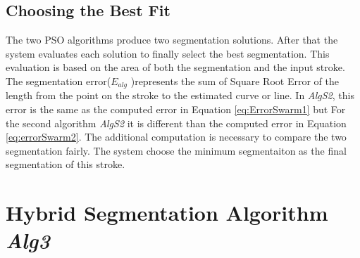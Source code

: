 \subsection{Choosing the Best Fit}
\label{sec:bestFit}
The two PSO algorithms produce two segmentation solutions. After that the system evaluates each solution to finally select the best segmentation. This evaluation is based on the area of both the segmentation and the input stroke. The segmentation error($E_{alg}$ )represents the sum of Square Root Error of the length from the point on the stroke to the estimated curve or line. In \textsl{AlgS2}, this error is the same as the computed error in Equation \ref{eq:ErrorSwarm1} but For the second algorithm \textsl{AlgS2} it is different than the computed error in Equation \ref{eq:errorSwarm2}. The additional computation is necessary to  compare the two segmentation fairly. The system choose the minimum segmentaiton as the final segmentation of this stroke. 
  
\section{Hybrid Segmentation Algorithm \textsl{Alg3}}
\label{sec:BenchMarckAlgorithm}

